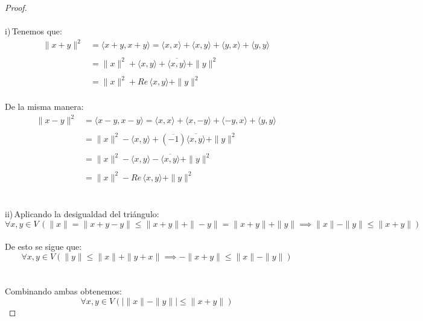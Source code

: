 \documentclass[11pt,letterpaper]{article}
\begin{document}
\begin{proof}\,\\
	\,\\
	i)\,Tenemos que:\,\\
	\begin{align*}
		\|x+y\|^2&=\langle x+y,x+y\rangle=\langle x,x\rangle+\langle x,y\rangle+\langle y,x\rangle+\langle y,y\rangle\,\\
		\,\\
		&=\|x\|^2+\langle x,y\rangle+\overline{\langle x,y\rangle}+\|y\|^2\,\\
		\,\\
		&=\|x\|^2+Re\,\langle x,y\rangle+\|y\|^2
	\end{align*}\,\\
	De la misma manera:\,\\
	\begin{align*}
		\|x-y\|^2&=\langle x-y,x-y\rangle=\langle x,x\rangle+\langle x,-y\rangle+\langle -y,x\rangle+\langle y,y\rangle\,\\
		\,\\
		&=\|x\|^2-\langle x,y\rangle+(\overline{-1})\overline{\langle x,y\rangle}+\|y\|^2\,\\
		\,\\
		&=\|x\|^2-\langle x,y\rangle-\overline{\langle x,y\rangle}+\|y\|^2\,\\
		\,\\
		&=\|x\|^2-Re\,\langle x,y\rangle+\|y\|^2
	\end{align*}\,\\
	\,\\
	ii)\,Aplicando la desigualdad del tri\'angulo:\,\\
	\begin{equation*}
		\forall x,y\in V\,(\|x\|=\|x+y-y\|\leq\|x+y\|+\|-y\|=\|x+y\|+\|y\|\implies\|x\|-\|y\|\leq \|x+y\|)
	\end{equation*}\,\\
	De esto se sigue que:\,\\
	\begin{equation*}
		\forall x,y\in V(\|y\|\leq\|x\|+\|y+x\|\implies-\|x+y\|\leq\|x\|-\|y\|)
	\end{equation*}\,\\
	\,\\
	Combinando ambas obtenemos:\,\\
	\begin{equation*}
		\forall x,y\in V (|\|x\|-\|y\||\leq\|x+y\|)
	\end{equation*}
\end{proof}\,\\
\end{document}
